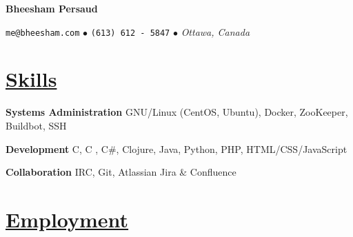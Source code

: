 \documentclass[11pt]{article} %
\newcommand{\heading}[1]{
	\section*{\uline{\hfill #1 }} %
}
\newcommand{\contact}[3]{
    \centerline{ \large \texttt{#1} $\bullet$ \texttt{#2} $\bullet$ \emph{#3} }
}
\newcommand{\skill}[2]{
    \textbf{#1} \tabto{2.5in} #2
}
\newcommand{\CPP}{
    C\hspace{-.05em}\raisebox{.4ex}{\tiny\bf +}\hspace{-.10em}\raisebox{.4ex}{\tiny\bf +}
}
\begin{document}
\centerline{{\huge \bf Bheesham Persaud}}
\bigskip

\contact{me@bheesham.com}
        {(613) 612 - 5847}
        {Ottawa, Canada}

\heading{Skills}%

\skill{Systems Administration}
      {GNU/Linux (CentOS, Ubuntu), Docker, ZooKeeper, Buildbot, SSH}

\skill{Development}
      {C, \CPP, C\#, Clojure, Java, Python, PHP, HTML/CSS/JavaScript}

\skill{Collaboration}
      {IRC, Git, Atlassian Jira \& Confluence}


\heading{Employment}%
\end{document}

